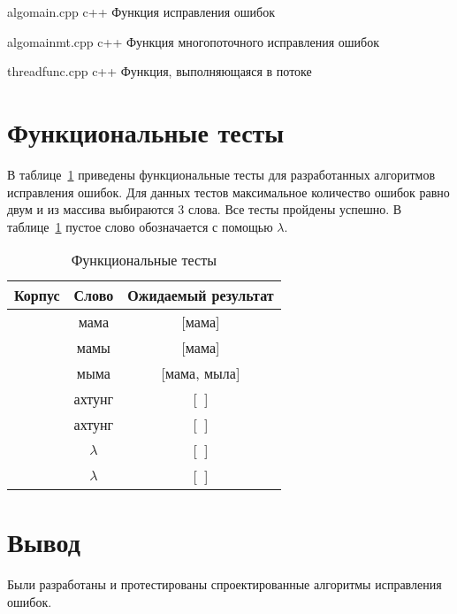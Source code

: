 \clearpage
{}
{algomain.cpp} %
{c++} %
{Функция исправления ошибок} %

\clearpage

{algomainmt.cpp} %
{c++} %
{Функция многопоточного исправления ошибок} %

\clearpage

{threadfunc.cpp} %
{c++} %
{Функция, выполняющаяся в потоке} %

\clearpage

\section{Функциональные тесты}

В таблице~\ref{tbl:func_tests} приведены функциональные тесты для разработанных алгоритмов исправления ошибок. Для данных тестов максимальное количество ошибок равно двум и из массива выбираются 3 слова. Все тесты пройдены успешно. В таблице~\ref{tbl:func_tests} пустое слово обозначается с помощью $\lambda$.

\begin{table}[ht]
	\small
	\begin{center}
		\begin{threeparttable}
			\caption{Функциональные тесты}
			\label{tbl:func_tests}
			\begin{tabular}{|c|c|c|}
				\hline
				\bfseries Корпус
				& \bfseries Слово
				& \bfseries Ожидаемый результат \\ 
				\hline
				[мама, мыла, раму] & мама & [мама] \\
				\hline
				[мама, мыла, раму]  & мамы & [мама] \\
				\hline
				[мама, мыла, раму]  & мыма & [мама, мыла] \\
				\hline
				[мама, мыла, раму]  & ахтунг & [~] \\
				\hline
				[~]  & ахтунг & [~] \\
				\hline
				[~]  & $\lambda$ & [~] \\
				\hline
				[Мама, Мыла, Раму]  & $\lambda$ & [~] \\
				\hline
			\end{tabular}	
		\end{threeparttable}	
	\end{center}
\end{table}


\section*{Вывод}
Были разработаны и протестированы спроектированные алгоритмы исправления ошибок.

